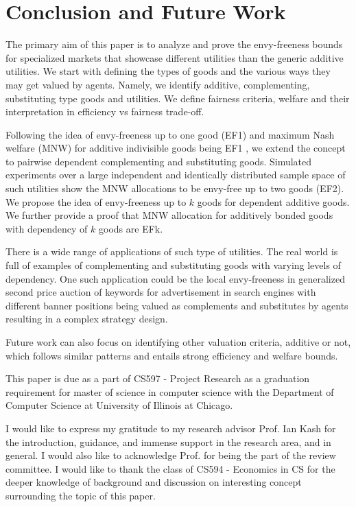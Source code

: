 
\section{Conclusion and Future Work}
\label{section_conclusion}

The primary aim of this paper is to analyze and prove the envy-freeness bounds for specialized markets that showcase different utilities than the generic additive utilities. We start with defining the types of goods and the various ways they may get valued by agents. Namely, we identify additive, complementing, substituting type goods and utilities. We define fairness criteria, welfare and their interpretation in efficiency vs fairness trade-off. 

Following the idea of envy-freeness up to one good (EF1) and maximum Nash welfare (MNW) for additive indivisible goods being EF1 \cite{caragiannis2016unreasonable}, we extend the concept to pairwise dependent complementing and substituting goods. Simulated experiments over a large independent and identically distributed sample space of such utilities show the MNW allocations to be envy-free up to two goods (EF2). We propose the idea of envy-freeness up to $k$ goods for dependent additive goods. We further provide a proof that MNW allocation for additively bonded goods with depend\-ency of $k$ goods are EFk.

There is a wide range of applications of such type of utilities. The real world is full of examples of complementing and substituting goods with varying levels of dependency. One such application could be the local envy-freeness in generalized second price auction of keywords for advertisement in search engines \cite{edelman2007internet} with different banner positions being valued as complements and substitutes by agents resulting in a complex strategy design. 

Future work can also focus on identifying other valuation criteria, additive or not, which follows similar patterns and entails strong efficiency and welfare bounds.


\begin{acks}
This paper is due as a part of CS597 - Project Research as a graduation requirement for master of science in computer science with the Department of Computer Science at University of Illinois at Chicago.

I would like to express my gratitude to my research advisor Prof. Ian Kash for the introduction, guidance, and immense support in the research area, and in general. I would also like to acknowledge Prof.           for being the part of the review committee. I would like to thank the class of CS594 - Economics in CS for the deeper knowledge of background and discussion on interesting concept surrounding the topic of this paper.


\end{acks}